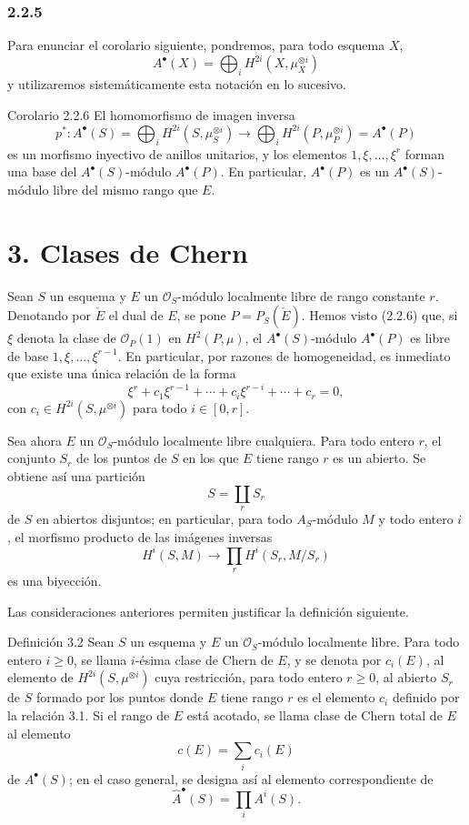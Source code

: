 \subsubsection*{2.2.5}
Para enunciar el corolario siguiente, pondremos, para todo esquema $X$,
\[
A^\bullet(X)=\bigoplus_i H^{2i}(X,\mu_X^{\otimes i})
\]
y utilizaremos sistemáticamente esta notación en lo sucesivo.

\begin{statement}{Corolario 2.2.6}
El homomorfismo de imagen inversa
\[
p^*:A^\bullet(S)=\bigoplus_i H^{2i}(S,\mu_S^{\otimes i})
\longrightarrow
\bigoplus_i H^{2i}(P,\mu_P^{\otimes i})=A^\bullet(P)
\]
es un morfismo inyectivo de anillos unitarios, y los elementos $1,\xi,\ldots,\xi^r$ forman una base del $A^\bullet(S)$-módulo $A^\bullet(P)$. En particular, $A^\bullet(P)$ es un $A^\bullet(S)$-módulo libre del mismo rango que $E$.
\end{statement}

\section*{3. Clases de Chern}

Sean $S$ un esquema y $E$ un $\mathcal O_S$-módulo localmente libre de rango constante $r$. Denotando por $\check E$ el dual de $E$, se pone $P=P_S(\check E)$. Hemos visto (2.2.6) que, si $\xi$ denota la clase de $\mathcal O_P(1)$ en $H^2(P,\mu)$, el $A^\bullet(S)$-módulo $A^\bullet(P)$ es libre de base $1,\xi,\ldots,\xi^{r-1}$. En particular, por razones de homogeneidad, es inmediato que existe una única relación de la forma
\[
\xi^r+c_1\xi^{r-1}+\cdots+c_i\xi^{r-i}+\cdots+c_r=0,
\tag{3.1}
\]
con $c_i\in H^{2i}(S,\mu^{\otimes i})$ para todo $i\in[0,r]$.

Sea ahora $E$ un $\mathcal O_S$-módulo localmente libre cualquiera. Para todo entero $r$, el conjunto $S_r$ de los puntos de $S$ en los que $E$ tiene rango $r$ es un abierto. Se obtiene así una partición
\[
S=\coprod_r S_r
\]
de $S$ en abiertos disjuntos; en particular, para todo $A_S$-módulo $M$ y todo entero $i$, el morfismo producto de las imágenes inversas
\[
H^i(S,M)\longrightarrow \prod_r H^i(S_r,M/S_r)
\]
es una biyección.

Las consideraciones anteriores permiten justificar la definición siguiente.

\begin{statement}{Definición 3.2}
Sean $S$ un esquema y $E$ un $\mathcal O_S$-módulo localmente libre. Para todo entero $i\ge0$, se llama $i$-ésima clase de Chern de $E$, y se denota por $c_i(E)$, al elemento de $H^{2i}(S,\mu^{\otimes i})$ cuya restricción, para todo entero $r\ge0$, al abierto $S_r$ de $S$ formado por los puntos donde $E$ tiene rango $r$ es el elemento $c_i$ definido por la relación 3.1. Si el rango de $E$ está acotado, se llama clase de Chern total de $E$ al elemento
\[
c(E)=\sum_i c_i(E)
\]
de $A^\bullet(S)$; en el caso general, se designa así al elemento correspondiente de
\[
\widehat A^{\bullet}(S)=\prod_i A^i(S).
\]
\end{statement}

